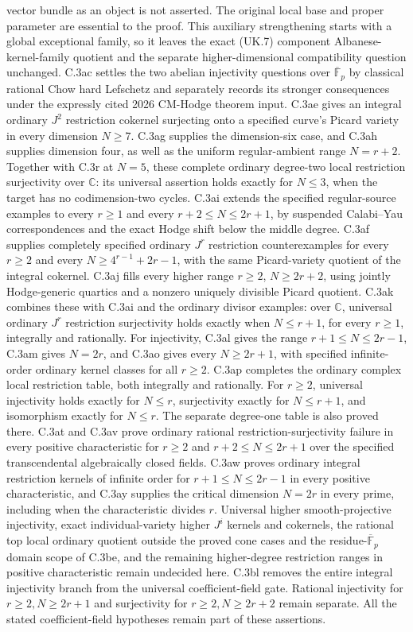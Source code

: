 vector bundle as an object is not asserted. The original local base and
proper parameter are essential to the proof. This auxiliary strengthening
starts with a global exceptional family, so it leaves the exact (UK.7)
component Albanese-kernel-family quotient and the separate higher-dimensional
compatibility question unchanged.
C.3ac settles the two abelian
injectivity questions over $\overline{\mathbb F}_p$ by
classical rational Chow hard Lefschetz and separately
records its stronger consequences under the expressly
cited 2026 CM-Hodge theorem input.
C.3ae gives an integral ordinary $J^2$ restriction cokernel
surjecting onto a specified curve's Picard variety in every
dimension $N\ge7$. C.3ag supplies the dimension-six case,
and C.3ah supplies dimension four, as well as the uniform
regular-ambient range $N=r+2$. Together with C.3r at $N=5$,
these complete ordinary degree-two local restriction
surjectivity over $\mathbb C$: its universal assertion
holds exactly for $N\le3$, when the target has no
codimension-two cycles.
C.3ai extends the specified regular-source examples to every
$r\ge1$ and every $r+2\le N\le2r+1$, by suspended
Calabi--Yau correspondences and the exact Hodge shift below
the middle degree.
C.3af supplies completely specified ordinary $J^r$
restriction counterexamples for every $r\ge2$ and every
$N\ge4^{r-1}+2r-1$, with the same Picard-variety quotient
of the integral cokernel. C.3aj fills every higher range
$r\ge2$, $N\ge2r+2$, using jointly Hodge-generic quartics
and a nonzero uniquely divisible Picard quotient.
C.3ak combines these with C.3ai and the ordinary divisor
examples: over $\mathbb C$, universal ordinary $J^r$
restriction surjectivity holds exactly when $N\le r+1$,
for every $r\ge1$, integrally and rationally.
For injectivity, C.3al gives the range
$r+1\le N\le2r-1$, C.3am gives $N=2r$, and C.3ao gives
every $N\ge2r+1$, with specified infinite-order ordinary
kernel classes for all $r\ge2$. C.3ap completes the
ordinary complex local restriction table, both integrally
and rationally. For $r\ge2$, universal injectivity holds
exactly for $N\le r$, surjectivity exactly for $N\le r+1$,
and isomorphism exactly for $N\le r$. The separate
degree-one table is also proved there.
C.3at and C.3av prove ordinary rational restriction-surjectivity
failure in every positive characteristic for
$r\ge2$ and $r+2\le N\le2r+1$ over the specified
transcendental algebraically closed fields. C.3aw proves
ordinary integral restriction kernels of infinite order for
$r+1\le N\le2r-1$ in every positive characteristic, and
C.3ay supplies the critical dimension $N=2r$ in every prime,
including when the characteristic divides $r$.
Universal higher smooth-projective injectivity, exact
individual-variety higher $J^i$ kernels and cokernels,
the rational top local ordinary quotient outside the proved
cone cases and the residue-$\overline{\mathbb F}_p$ domain scope
of C.3be, and the remaining higher-degree restriction ranges
in positive characteristic remain undecided here. C.3bl removes
the entire integral injectivity branch from the universal
coefficient-field gate. Rational injectivity for $r\ge2,N\ge2r+1$
and surjectivity for
$r\ge2,N\ge2r+2$ remain separate. All the stated
coefficient-field hypotheses remain
part of these assertions.

